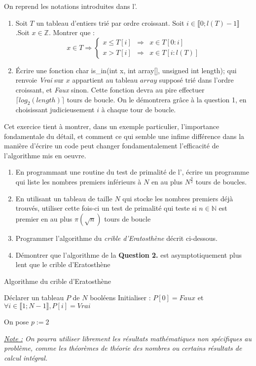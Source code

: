 \documentclass[../../../main.tex]{subfiles}
\begin{document}
 On reprend les notations introduites dans l'.
\begin{enumerate}
	\item Soit $T$ un tableau d'entiers trié par ordre croissant. Soit $i\in \llbracket 0; l(T)-1\rrbracket$.Soit $x\in\mathbb{Z}$. Montrer que :
	$$x\in T\Rightarrow \left\{\begin{array}{lcl}
	x\leq T[i] & \Rightarrow & x\in T[0:i] \\
	x> T[i] & \Rightarrow & x\in T[i:l(T)]\end{array}\right.$$
	\item Écrire une fonction \textsf{char is\_in(int x, int array[], unsigned int length);} qui renvoie \textit{Vrai} sur $x$ appartient au tableau $array$ supposé trié dans l'ordre croissant, et \textit{Faux} sinon. Cette fonction devra au pire effectuer $\lceil log_2(length)\rceil$ tours de boucle. On le démontrera grâce à la question 1, en choisissant judicieusement $i$ à chaque tour de boucle.
\end{enumerate}
 Cet exercice tient à montrer, dans un exemple particulier, l'importance fondamentale du détail, et comment ce qui semble une infime différence dans la manière d'écrire un code peut changer fondamentalement l'efficacité de l'algorithme mis en oeuvre.
\begin{enumerate}
	\item En programmant une routine du test de primalité de l', écrire un programme qui liste les nombres premiers inférieurs à $N$ en au plus $N^{\frac{3}{2}}$ tours de boucles.
	\item En utilisant un tableau de taille $N$ qui stocke les nombres premiers déjà trouvés, utiliser cette fois-ci un test de primalité qui teste si $n\in\mathbb{N}$ est premier en au plus $\pi(\sqrt{n})$ tours de boucle
	\item Programmer l'algorithme du \textit{crible d'Eratosthène} décrit ci-dessous.
	\item Démontrer que l'algorithme de la \textbf{Question 2.} est asymptotiquement plus lent que le crible d'Eratosthène
\end{enumerate}
\begin{algorithm}
\caption{Algorithme du crible d'Eratosthène}

Déclarer un tableau $P$ de $N$ booléens\;
Initialiser : $P[0] = Faux$ et $\forall i\in\llbracket 1; N-1\rrbracket, P[i] = Vrai$\;

On pose $p := 2$\;
 {
}
\end{algorithm}
\textit{\underline{Note :} On pourra utiliser librement les résultats mathématiques non spécifiques au problème, comme les théorèmes de théorie des nombres ou certains résultats de calcul intégral.
}
\end{document}
